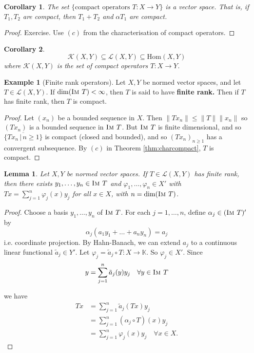 \documentclass[10pt, oneside, reqno]{amsart}
\theoremstyle{plain}%
\newtheorem{lem}[thm]{Lemma}
\newtheorem*{cor}{Corollary}
\theoremstyle{definition}
\newtheorem{exmp}[thm]{Example}
\theoremstyle{remark}
\newcommand{\given}{ \, | \,}
\newcommand{\K}{\mathbb{K}}
\renewcommand{\phi}{\varphi}
\newcommand{\im}{\textsc{Im\ }}
\begin{document}
\begin{cor}
	The set $\{ \text{compact operators $T : X \rightarrow Y$}\}$ is a vector space.  That is, if $T_1, T_2$ are compact, then $T_1 + T_2$ and $\alpha T_1$ are compact.  
\end{cor}

\begin{proof}
	Exercise.  Use $(c)$ from the characterisation of compact operators.
\end{proof}

\begin{cor}
	\[
		\mathcal K(X,Y) \subseteq \mathcal L(X, Y) \subseteq \text{Hom}(X,Y)
	\] where $\mathcal K(X,Y)$ is the set of compact operators $T : X \rightarrow Y$. 
\end{cor}

\begin{exmp}[Finite rank operators]  
	Let $X, Y$ be normed vector spaces, and let $T \in \mathcal L(X,Y)$.  If $\dim(\im T) < \infty$, then $T$ is said to have \textbf{finite rank.}  Then if $T$ has finite rank, then $T$ is compact.
\end{exmp}

\begin{proof}
	Let $(x_n)$ be a bounded sequence in $X$.  Then $\| Tx_n \| \leq \| T \| \| x_n \|$ so $(Tx_n)$ is a bounded sequence in $\im T$.  But $\im T$ is finite dimensional, and so $\overline{ \{ Tx_n \given n \geq 1 \}}$ is compact (closed and bounded), and so $(Tx_n)_{n \geq 1}$ has a convergent subsequence.  By $(c)$ in Theorem \ref{thm:charcompact}, $T$ is compact. 
\end{proof}

\begin{lem}
	Let $X, Y$ be normed vector spaces.  If $T \in \mathcal L(X,Y)$ has finite rank, then there exists $y_1, \dots, y_n \in \im T$ and $\phi_1, \dots, \phi_n \in X'$ with $Tx = \sum_{j=1}^n \phi_j(x) y_j$ for all $x \in X$, with $n = \dim( \im T)$. 
\end{lem}

\begin{proof}
	Choose a basis $y_1, \dots, y_n$ of $\im T$.  For each $j = 1, \dots, n$, define $\alpha_j \in (\im T)'$ by \[
		\alpha_j(a_1 y_1 + \dots + a_n y_n) = a_j
	\] i.e. coordinate projection.  By Hahn-Banach, we can extend $a_j$ to a continuous linear functional $\tilde a_j \in Y'$.  Let $\phi_j = \tilde a_j \circ T : X \rightarrow \K$.  So $\phi_j \in X'$.  Since \[
		 y = \sum_{j=1}^n \tilde a_j(y) y_j \quad \forall y \in \im T
	\] 
	
	we have \begin{align*}
		Tx 	&= \sum_{j= 1}^n \tilde a_j (Tx) y_j \\
			&= \sum_{j=1}^n (\alpha_j \circ T)(x) y_j	 \\
			&= \sum_{j=1}^n \phi_j(x) y_j \quad \forall x \in X.
	\end{align*}
\end{proof}
\end{document}
